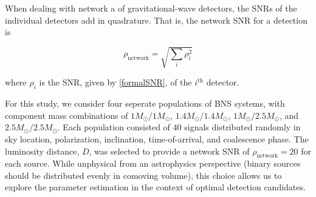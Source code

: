 \documentclass[11pt,a4paper]{emulateapj}
\begin{document}
When dealing with network a of gravitational-wave detectors, the SNRs of the individual detectors add in quadrature.  That is, the network SNR for a detection is

\begin{equation}
\rho_{\text{network}} = \sqrt{\sum_i \rho_{i}^2}
\label{SNRnetwork}
\end{equation}

\noindent where $\rho_i$ is the SNR, given by \eqref{formalSNR}, of the $i^{\text{th}}$ detector.

For this study, we consider four seperate populations of BNS systems, with component mass 
combinations of $1M_{\odot}/1M_{\odot}$, $1.4M_{\odot}/1.4M_{\odot}$, $1M_{\odot}/2.5M_{\odot}$, 
and $2.5M_{\odot}/2.5M_{\odot}$.  Each population consisted of 40 signals distributed randomly
in sky location, polarization, inclination, time-of-arrival, and coalescence phase.  The luminosity 
distance, $D$, was selected to provide a network SNR of $\rho_{\text{network}}=20$ for each source.
While unphysical from an astrophysics perspective (binary sources should be 
distributed evenly in comoving volume), this choice allows us to explore the parameter estimation
in the context of optimal detection candidates. 
\end{document}
